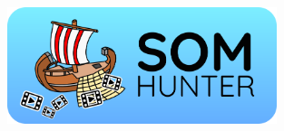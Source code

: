 \begin{figure}[b]
	\centering
	\includegraphics[width=0.7\textwidth]{img/somhunter-logo.png}
	\label{fig:sh-arch}
\end{figure}
